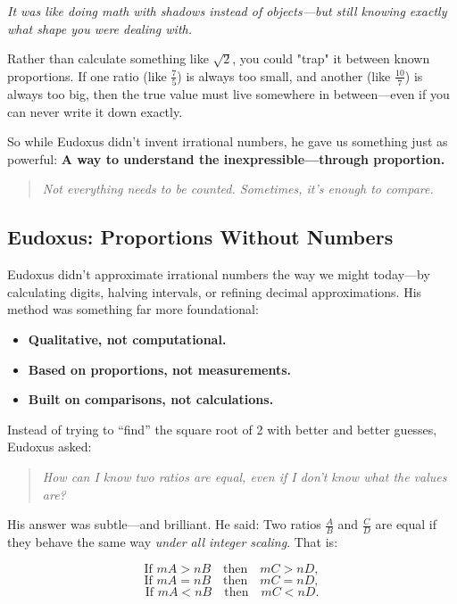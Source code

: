 \textit{It was like doing math with shadows instead of objects—but still knowing exactly what shape you were dealing with.}

Rather than calculate something like \( \sqrt{2} \), you could "trap" it between known proportions. If one ratio (like \( \frac{7}{5} \)) is always too small, and another (like \( \frac{10}{7} \)) is always too big, then the true value must live somewhere in between—even if you can never write it down exactly.

\medskip

So while Eudoxus didn’t invent irrational numbers, he gave us something just as powerful:  
\textbf{A way to understand the inexpressible—through proportion.}

\begin{quote}
\textit{Not everything needs to be counted.  Sometimes, it’s enough to compare.}
\end{quote}



\subsection{Eudoxus: Proportions Without Numbers}

Eudoxus didn’t approximate irrational numbers the way we might today—by calculating digits, halving intervals, or refining decimal approximations. His method was something far more foundational:  

\begin{itemize}
    \item \textbf{Qualitative, not computational.}
    \item \textbf{Based on proportions, not measurements.}
    \item \textbf{Built on comparisons, not calculations.}
\end{itemize}

Instead of trying to “find” the square root of 2 with better and better guesses, Eudoxus asked:

\begin{quote}
\textit{How can I know two ratios are equal, even if I don’t know what the values are?}
\end{quote}

\noindent His answer was subtle—and brilliant. He said:  
Two ratios \( \frac{A}{B} \) and \( \frac{C}{D} \) are equal if they behave the same way \textit{under all integer scaling}. That is:

\[
\text{If } mA > nB \quad \text{then} \quad mC > nD,
\]
\[
\text{If } mA = nB \quad \text{then} \quad mC = nD,
\]
\[
\text{If } mA < nB \quad \text{then} \quad mC < nD.
\]

